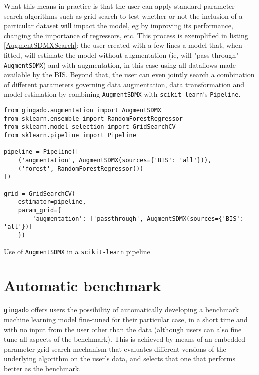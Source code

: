 \documentclass{article}
\begin{document}
What this means in practice is that the user can apply standard parameter search algorithms such as grid search to test whether or not the inclusion of a particular dataset will impact the model, eg by improving its performance, changing the importance of regressors, etc. This process is exemplified in listing \ref{AugmentSDMXSearch}: the user created with a few lines a model that, when fitted, will estimate the model without augmentation (ie, will "pass through" \texttt{AugmentSDMX}) and with augmentation, in this case using all dataflows made available by the BIS. Beyond that, the user can even jointly search a combination of different parameters governing data augmentation, data transformation and model estimation by combining \texttt{AugmentSDMX} with \texttt{scikit-learn}'s \texttt{Pipeline}.

\begin{listing}[h]
\begin{verbatim}
from gingado.augmentation import AugmentSDMX
from sklearn.ensemble import RandomForestRegressor
from sklearn.model_selection import GridSearchCV
from sklearn.pipeline import Pipeline

pipeline = Pipeline([
    ('augmentation', AugmentSDMX(sources={'BIS': 'all'})),
    ('forest', RandomForestRegressor())
])

grid = GridSearchCV(
    estimator=pipeline,
    param_grid={
        'augmentation': ['passthrough', AugmentSDMX(sources={'BIS': 'all'})]
    })
\end{verbatim} 
\caption{Use of \texttt{AugmentSDMX} in a \texttt{scikit-learn} pipeline}
\label{AugmentSDMXSearch}
\end{listing}

\section{Automatic benchmark} \label{bench}

\texttt{gingado} offers users the possibility of automatically developing a benchmark machine learning model fine-tuned for their particular case, in a short time and with no input from the user other than the data (although users can also fine tune all aspects of the benchmark). This is achieved by means of an embedded parameter grid search mechanism that evaluates different versions of the underlying algorithm on the user's data, and selects that one that performs better as the benchmark.
\end{document}
